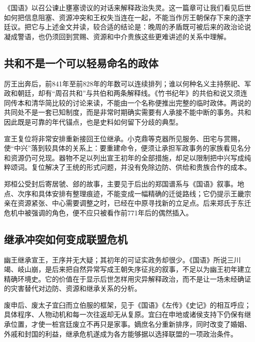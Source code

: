 《国语》以召公谏止壅塞谤议的对话来解释政治失灵。这一篇章可让我们看见后世如何把信息阻塞、资源冲突和王权失当连在一起，不能当作厉王朝保存下来的逐字廷议。把它与上述金文并读，较合适的结论是：晚周的矛盾既可被后来的政治论说凝成警语，也仍须回到赏赐、资源和中介贵族这些更难讲述的关系中理解。

\subsection{共和不是一个可以轻易命名的政体}

厉王出奔后，前841年至前828年的年数可以连续排列；谁以何种名义主持祭祀、军政和朝廷，却有“周召共和”与共伯和两条解释线。《竹书纪年》的共伯和说又须连同传本和清华简比较的讨论来读，不能由一个名称便推出完整的临时政体。两说的共同处不是一套已知制度，而是非常时期确实需要有人承接不能中断的事务。共和因此既是可靠的年代锚点，也是史料如何留下分歧的典型。

宣王复位将非常安排重新接回王位继承。小克鼎等克器所见服务、田宅与赏赐，使“中兴”落到较具体的关系上：要重建命令，便须让承担军政事务的家族看见名分和资源仍可兑现。器物不足以列出宣王初年的全部措施，却足以限制把中兴写成纯粹颂词。复位解决了王统的形式问题，并没有免除边防、供给和贵族合作的成本。

郑桓公受封后寄居虢、郐的故事，主要见于后出的郑国谱系与《国语》叙事。地点、次序和具体安排有整理痕迹，不能变成一幅精确的迁徙路线；它仍提示王畿宗亲在资源紧张、中心需要调整之时，已经在中原寻找新的立足点。后来郑氏于东迁危机中被强调的角色，便不应只被看作前771年后的偶然插入。

\subsection{继承冲突如何变成联盟危机}

幽王继承宣王，王序并无大疑；其初年的可证实政务却很少。《国语》所说三川竭、岐山崩，是后来把自然异常写成王朝失序征兆的叙事，不足以为幽王初年建立精确环境史。它的价值在于显示后世怎样用灾异解释政治，而不是让一场未经确证的灾害替代对边防、资源和继承关系的分析。

废申后、废太子宜臼而立伯服的框架，见于《国语》《左传》《史记》的相互呼应；具体程序、人物动机和每一次往返却无从复原。宜臼在申地或诸侯支持下仍保有继承位置，才使一桩宫廷废立不再只是家事。嫡庶名分重新排序，同时改变了婚姻、外戚和封国的利益，继承危机遂成为各方能够据以选择联盟的一项政治条件。

